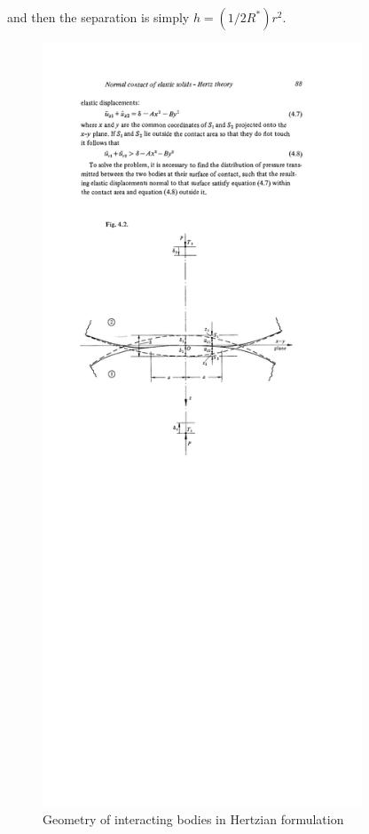 and then the separation is simply $h = (1/2R^*)r^2$.

\begin{figure}[ht!]
	\centering
	\includegraphics[width=0.85\textwidth]{figures/hertzGeometry}
	\caption{Geometry of interacting bodies in Hertzian formulation}
	\label{fig:hertzgeometry}
\end{figure}

